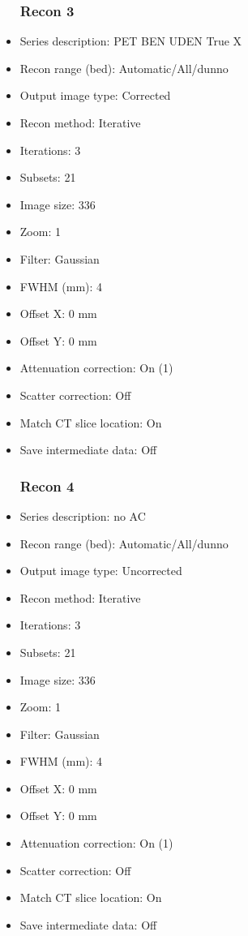 \documentclass[12pt]{article}
\begin{document}
\begin{itemize}
\subsubsection{Recon 3}
\item Series description: PET BEN UDEN True X
\item Recon range (bed): Automatic/All/dunno
\item Output image type: Corrected
\item Recon method: Iterative
\item Iterations: 3
\item Subsets: 21
\item Image size: 336
\item Zoom: 1
\item Filter: Gaussian
\item FWHM (mm): 4
\item Offset X: 0 mm
\item Offset Y: 0 mm
\item Attenuation correction: On (1)
\item Scatter correction: Off
\item Match CT slice location: On
\item Save intermediate data: Off
\subsubsection{Recon 4}
\item Series description: no AC
\item Recon range (bed): Automatic/All/dunno
\item Output image type: Uncorrected
\item Recon method: Iterative
\item Iterations: 3
\item Subsets: 21
\item Image size: 336
\item Zoom: 1
\item Filter: Gaussian
\item FWHM (mm): 4
\item Offset X: 0 mm
\item Offset Y: 0 mm
\item Attenuation correction: On (1)
\item Scatter correction: Off
\item Match CT slice location: On
\item Save intermediate data: Off
\end{itemize}
\end{document}
